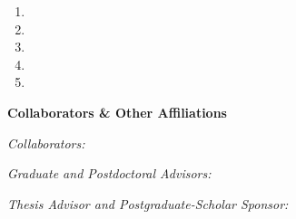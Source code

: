 
\begin{enumerate}
\item

\item

\item

\item

\item
\end{enumerate}

\vspace{12pt}
{\bf Collaborators \& Other Affiliations}

\vspace{12pt}
\emph{Collaborators:}

\vspace{12pt}
\emph{Graduate and Postdoctoral Advisors:}

\vspace{12pt}
\emph{Thesis Advisor and Postgraduate-Scholar Sponsor:}


